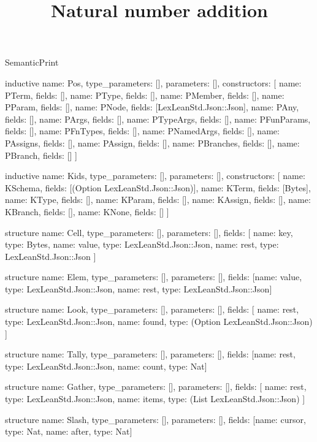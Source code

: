 \begin{lexlean}{SemanticPrint}
\title{Natural number addition}
\begin{semanticmodule}
inductive{
  name: Pos,
  type_parameters: [],
  parameters: [],
  constructors: [
    {name: PTerm, fields: []},
    {name: PType, fields: []},
    {name: PMember, fields: []},
    {name: PParam, fields: []},
    {name: PNode, fields: [LexLeanStd.Json::Json]},
    {name: PAny, fields: []},
    {name: PArgs, fields: []},
    {name: PTypeArgs, fields: []},
    {name: PFunParams, fields: []},
    {name: PFnTypes, fields: []},
    {name: PNamedArgs, fields: []},
    {name: PAssigns, fields: []},
    {name: PAssign, fields: []},
    {name: PBranches, fields: []},
    {name: PBranch, fields: []}
  ]
}

inductive{
  name: Kids,
  type_parameters: [],
  parameters: [],
  constructors: [
    {name: KSchema, fields: [(Option LexLeanStd.Json::Json)]},
    {name: KTerm, fields: [Bytes]},
    {name: KType, fields: []},
    {name: KParam, fields: []},
    {name: KAssign, fields: []},
    {name: KBranch, fields: []},
    {name: KNone, fields: []}
  ]
}

structure{
  name: Cell,
  type_parameters: [],
  parameters: [],
  fields: [
    {name: key, type: Bytes},
    {name: value, type: LexLeanStd.Json::Json},
    {name: rest, type: LexLeanStd.Json::Json}
  ]
}

structure{
  name: Elem,
  type_parameters: [],
  parameters: [],
  fields: [{name: value, type: LexLeanStd.Json::Json}, {name: rest, type: LexLeanStd.Json::Json}]
}

structure{
  name: Look,
  type_parameters: [],
  parameters: [],
  fields: [
    {name: rest, type: LexLeanStd.Json::Json},
    {name: found, type: (Option LexLeanStd.Json::Json)}
  ]
}

structure{
  name: Tally,
  type_parameters: [],
  parameters: [],
  fields: [{name: rest, type: LexLeanStd.Json::Json}, {name: count, type: Nat}]
}

structure{
  name: Gather,
  type_parameters: [],
  parameters: [],
  fields: [
    {name: rest, type: LexLeanStd.Json::Json},
    {name: items, type: (List LexLeanStd.Json::Json)}
  ]
}

structure{
  name: Slash,
  type_parameters: [],
  parameters: [],
  fields: [{name: cursor, type: Nat}, {name: after, type: Nat}]
}


\end{semanticmodule}
\end{lexlean}
